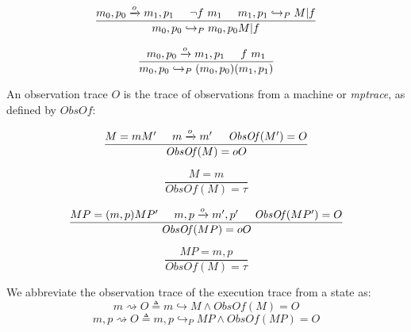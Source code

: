 \documentclass{article}
\begin{document}
    \begin{minipage}[b]{.45\textwidth}
      \[\frac{m_0,p_0 \xrightarrow{o} m_1,p_1 \hspace{.5cm} \neg f\ m_1 \hspace{.5cm} m_1,p_1
                \hookrightarrow_P M | f }
             {m_0,p_0 \hookrightarrow_P m_0,p_0 M | f}\]
    \end{minipage}
    \begin{minipage}[b]{.45\textwidth}
      \[\frac{m_0,p_0 \xrightarrow{o} m_1,p_1 \hspace{.5cm} f\ m_1}
             {m_0,p_0 \hookrightarrow_P (m_0,p_0) (m_1,p_1)}\]
    \end{minipage}
    \vspace{\belowdisplayskip}

    An observation trace \(O\) is the trace of observations from a machine or {\it mptrace},
    as defined by \(\mathit{ObsOf}\):
    
    \begin{minipage}[b]{.45\textwidth}
      \[\frac{M = mM' \hspace{.5cm} m \xrightarrow{o} m' \hspace{.5cm} \mathit{ObsOf}(M') = O}
             {\mathit{ObsOf}(M) = oO}\]
    \end{minipage}
    \begin{minipage}[b]{.45\textwidth}
      \[\frac{M = m}
             {\mathit{ObsOf}(M) = \tau}\]
    \end{minipage}
    \vspace{\belowdisplayskip}

    \begin{minipage}[b]{.45\textwidth}
      \[\frac{MP = (m,p)MP' \hspace{.5cm} m,p \xrightarrow{o} m',p' \hspace{.5cm} \mathit{ObsOf}(MP') = O}
             {\mathit{ObsOf}(MP) = oO}\]
    \end{minipage}
    \begin{minipage}[b]{.45\textwidth}
      \[\frac{MP = m,p}
             {\mathit{ObsOf}(M) = \tau}\]
    \end{minipage}
    \vspace{\belowdisplayskip}

    We abbreviate the observation trace of the execution trace from a state as:
    \[m \rightsquigarrow O \triangleq m \hookrightarrow M \land \mathit{ObsOf}(M) = O\]
    \[m,p \rightsquigarrow O \triangleq m,p \hookrightarrow_P MP \land \mathit{ObsOf}(MP) = O\]
\end{document}
